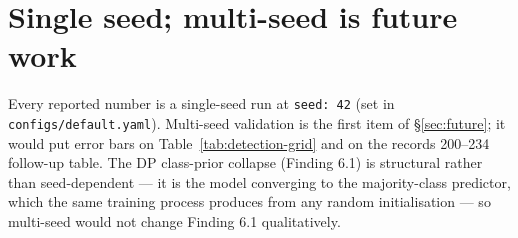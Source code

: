 \documentclass[11pt,a4paper]{report}
\begin{document}
\section{Single seed; multi-seed is future work}

Every reported number is a single-seed run at \texttt{seed: 42} (set in
\texttt{configs/default.yaml}). Multi-seed validation is the first item
of \S\ref{sec:future}; it would put error bars on
Table~\ref{tab:detection-grid} and on the records 200--234 follow-up
table. The DP class-prior collapse (Finding 6.1) is structural rather
than seed-dependent --- it is the model converging to the
majority-class predictor, which the same training process produces from
any random initialisation --- so multi-seed would not change Finding
6.1 qualitatively.
\end{document}
